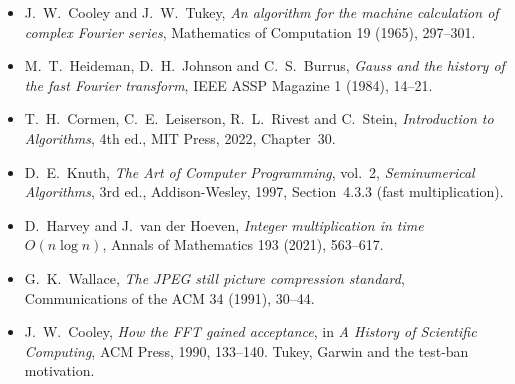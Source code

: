 \begin{itemize}
\item J.~W.~Cooley and J.~W.~Tukey, \emph{An algorithm for the machine calculation of complex Fourier series},
Mathematics of Computation 19 (1965), 297--301.
\item M.~T.~Heideman, D.~H.~Johnson and C.~S.~Burrus, \emph{Gauss and the history of the fast Fourier transform}, IEEE ASSP
Magazine 1 (1984), 14--21.
\item T.~H.~Cormen, C.~E.~Leiserson, R.~L.~Rivest and C.~Stein, \emph{Introduction to Algorithms}, 4th ed., MIT Press, 2022,
Chapter~30.
\item D.~E.~Knuth, \emph{The Art of Computer Programming}, vol.~2, \emph{Seminumerical Algorithms}, 3rd ed., Addison-Wesley,
1997, Section~4.3.3 (fast multiplication).
\item D.~Harvey and J.~van der Hoeven, \emph{Integer multiplication in time $O(n\log n)$}, Annals of Mathematics 193 (2021),
563--617.
\item G.~K.~Wallace, \emph{The JPEG still picture compression standard}, Communications of the ACM 34 (1991), 30--44.
\item J.~W.~Cooley, \emph{How the FFT gained acceptance}, in \emph{A History of Scientific Computing}, ACM Press, 1990, 133--140. Tukey, Garwin and the test-ban motivation.
\end{itemize}
